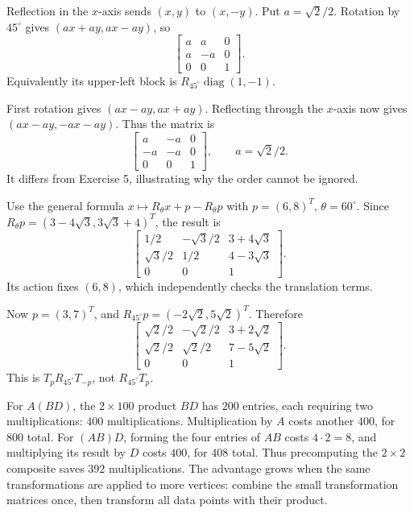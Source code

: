 Reflection in the $x$-axis sends $(x,y)$ to $(x,-y)$.
Put $a=\sqrt2/2$. Rotation by $45^\circ$ gives
$(ax+ay,ax-ay)$, so
\[
 \boxed{\begin{bmatrix}a&a&0\\a&-a&0\\0&0&1\end{bmatrix}}.
\]
Equivalently its upper-left block is $R_{45^\circ}\operatorname{diag}(1,-1)$.

First rotation gives $(ax-ay,ax+ay)$. Reflecting through the $x$-axis
now gives $(ax-ay,-ax-ay)$. Thus the matrix is
\[
 \boxed{\begin{bmatrix}a&-a&0\\-a&-a&0\\0&0&1\end{bmatrix}},\qquad a=\sqrt2/2.
\]
It differs from Exercise 5, illustrating why the order cannot be ignored.

Use the general formula $x\mapsto R_\theta x+p-R_\theta p$ with
$p=(6,8)^T$, $\theta=60^\circ$. Since
$R_\theta p=(3-4\sqrt3,3\sqrt3+4)^T$, the result is
\[
 \boxed{\begin{bmatrix}
 1/2&-\sqrt3/2&3+4\sqrt3\\
 \sqrt3/2&1/2&4-3\sqrt3\\0&0&1
 \end{bmatrix}}.
\]
Its action fixes $(6,8)$, which independently checks the translation terms.

Now $p=(3,7)^T$, and $R_{45^\circ}p=(-2\sqrt2,5\sqrt2)^T$.
Therefore
\[
 \boxed{\begin{bmatrix}
 \sqrt2/2&-\sqrt2/2&3+2\sqrt2\\
 \sqrt2/2&\sqrt2/2&7-5\sqrt2\\0&0&1
 \end{bmatrix}}.
\]
This is $T_pR_{45^\circ}T_{-p}$, not $R_{45^\circ}T_p$.

For $A(BD)$, the $2\times100$ product $BD$ has $200$ entries,
each requiring two multiplications: $400$ multiplications. Multiplication
by $A$ costs another $400$, for $800$ total.
For $(AB)D$, forming the four entries of $AB$ costs $4\cdot2=8$,
and multiplying its result by $D$ costs $400$, for $408$ total.
Thus precomputing the $2\times2$ composite saves $392$ multiplications.
The advantage grows when the same transformations are applied to more
vertices: combine the small transformation matrices once, then transform
all data points with their product.


